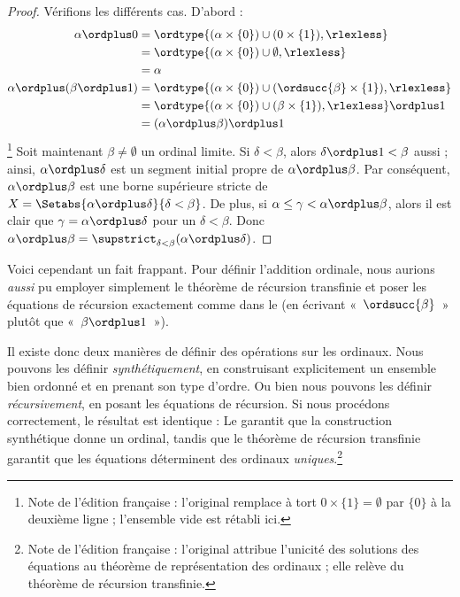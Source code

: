 \documentclass[../../../include/open-logic-section]{subfiles}
\begin{document}
\begin{proof}
Vérifions les différents cas. D'abord :
\begin{align*}
	\alpha \ordplus  0
	& = \ordtype{(\alpha \times \{0\})
	\cup (0 \times \{1\}), \rlexless} \\
	&= \ordtype{(\alpha \times \{0\})
	\cup \emptyset, \rlexless}\\
	&= \alpha\\
	\alpha \ordplus (\beta \ordplus  1)
	&= \ordtype{(\alpha\times \{0\})
	\cup (\ordsucc{\beta}\times \{1\}), \rlexless}\\
	&= \ordtype{(\alpha\times \{0\})
	\cup (\beta \times \{1\}), \rlexless} \ordplus 1\\
	&= (\alpha \ordplus  \beta) \ordplus  1
\end{align*}
\footnote{Note de l'édition française : l'original remplace
à tort $0\times\{1\}=\emptyset$ par $\{0\}$ à la
deuxième ligne ; l'ensemble vide est rétabli ici.}
Soit maintenant $\beta \neq \emptyset$ un ordinal limite.
Si $\delta < \beta$, alors
$\delta\ordplus 1 < \beta$ aussi ; ainsi,
$\alpha \ordplus \delta$ est un segment initial propre
de $\alpha \ordplus \beta$. Par conséquent,
$\alpha \ordplus \beta$ est une borne supérieure stricte
de $X = \Setabs{\alpha \ordplus \delta}{\delta < \beta}$.
De plus, si
$\alpha \leq \gamma < \alpha \ordplus \beta$,
alors il est clair que
$\gamma = \alpha \ordplus \delta$ pour un
$\delta < \beta$. Donc
$\alpha \ordplus \beta =
\supstrict_{\delta< \beta}(\alpha\ordplus \delta)$.
\end{proof}

Voici cependant un fait frappant. Pour définir
l'addition ordinale, nous aurions \emph{aussi} pu
employer simplement le théorème de récursion transfinie
et poser les équations de récursion exactement comme
dans le  (en écrivant
«~$\ordsucc{\beta}$~» plutôt que
«~$\beta \ordplus 1$~»).

Il existe donc deux manières de définir des opérations
sur les ordinaux. Nous pouvons les définir
\emph{synthétiquement}, en construisant explicitement
un ensemble bien ordonné et en prenant son type d'ordre.
Ou bien nous pouvons les définir \emph{récursivement},
en posant les équations de récursion. Si nous procédons
correctement, le résultat est identique :
Le 
garantit que la construction synthétique donne un
ordinal, tandis que le théorème de récursion transfinie
garantit que les équations déterminent des ordinaux
\emph{uniques}.\footnote{Note de l'édition française :
l'original attribue l'unicité des solutions des équations
au théorème de représentation des ordinaux ; elle relève
du théorème de récursion transfinie.}
\end{document}
